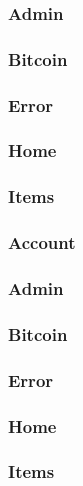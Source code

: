 \documentclass[11pt]{article} %
\begin{document}
\subsubsection{Admin}
\subsubsection{Bitcoin}
\subsubsection{Error}
\subsubsection{Home}
\subsubsection{Items}
\subsubsection{Account}
\subsubsection{Admin}
\subsubsection{Bitcoin}
\subsubsection{Error}
\subsubsection{Home}
\subsubsection{Items}
\end{document}
